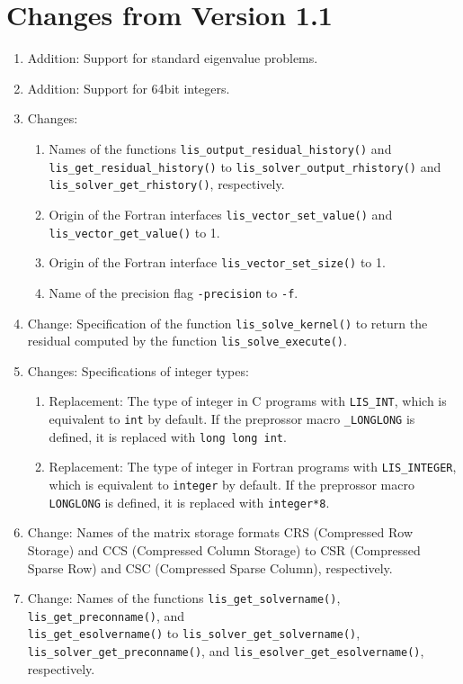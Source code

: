 \documentclass[a4paper]{article}
\begin{document}
\section*{Changes from Version 1.1}
\begin{enumerate}
\item Addition: Support for standard eigenvalue problems.
\item Addition: Support for 64bit integers.
\item Changes: 
\begin{enumerate}
\item Names of the functions 
      {\tt lis\_output\_residual\_history()} and \\
      {\tt lis\_get\_residual\_history()} to 
      {\tt lis\_solver\_output\_rhistory()} and \\
      {\tt lis\_solver\_get\_rhistory()}, respectively. 
\item Origin of the Fortran interfaces 
      {\tt lis\_vector\_set\_value()} and \\
      {\tt lis\_vector\_get\_value()} to 1.
\item Origin of the Fortran interface {\tt lis\_vector\_set\_size()} to 1. 
\item Name of the precision flag {\tt -precision} to {\tt -f}.
\end{enumerate}
\item Change: Specification of the function 
      {\tt lis\_solve\_kernel()} to return 
      the residual computed by the function {\tt lis\_solve\_execute()}. 
\item Changes: Specifications of integer types:
\begin{enumerate}
\item Replacement: The type of integer in C programs with {\tt LIS\_INT},
      which is equivalent to {\tt int} by default.
      If the preprossor macro {\tt \_LONGLONG} is defined, 
      it is replaced with {\tt long long int}.
\item Replacement: The type of integer in Fortran programs with 
      {\tt LIS\_INTEGER}, which is equivalent to {\tt integer} by default.
      If the preprossor macro {\tt LONGLONG} is defined, 
      it is replaced with {\tt integer*8}.
\end{enumerate}
\item Change: Names of the matrix storage formats CRS (Compressed Row Storage) 
      and CCS (Compressed Column Storage) to CSR (Compressed Sparse Row) 
      and CSC (Compressed Sparse Column), respectively. 
\item Change: Names of the functions 
      {\tt lis\_get\_solvername()}, {\tt lis\_get\_preconname()}, and \\
      {\tt lis\_get\_esolvername()} to 
      {\tt lis\_solver\_get\_solvername()}, 
      {\tt lis\_solver\_get\_preconname()}, and 
      {\tt lis\_esolver\_get\_esolvername()}, respectively.
\end{enumerate}
\end{document}
